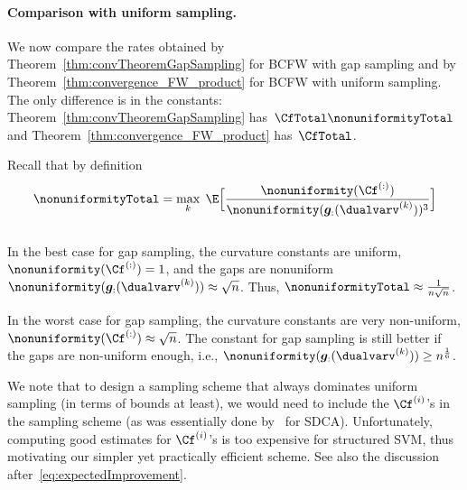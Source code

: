 \documentclass{article}
\begin{document}
\paragraph{Comparison with uniform sampling.} 
We now compare the rates obtained by Theorem~\ref{thm:convTheoremGapSampling} for BCFW with gap sampling and by Theorem~\ref{thm:convergence_FW_product} for BCFW with uniform sampling. The only difference is in the constants: Theorem~\ref{thm:convTheoremGapSampling} has~$\CfTotal \nonuniformityTotal$ and Theorem~\ref{thm:convergence_FW_product} has~$\CfTotal$. 

Recall that by definition\\[-0.4cm]
\begin{equation*}
\nonuniformityTotal = \max_k \;\E \Big[ \frac{\nonuniformity(\Cf^{(:)})}{\nonuniformity(\bm{g}_{:}(\dualvarv^{(k)}))^3} \Big]
\end{equation*}\\[-0.3cm]
In the best case for gap sampling, the curvature constants are uniform, $\nonuniformity(\Cf^{(:)})=1$, and the gaps are nonuniform~$\nonuniformity(\bm{g}_{:}(\dualvarv^{(k)})) \approx \sqrt{n}$. Thus, $\nonuniformityTotal \approx \frac{1}{n\sqrt{n}}$.

In the worst case for gap sampling, the curvature constants are very non-uniform, $\nonuniformity(\Cf^{(:)}) \approx \sqrt{n}$. The constant for gap sampling is still better if the gaps are non-uniform enough, i.e., $\nonuniformity(\bm{g}_{:}(\dualvarv^{(k)})) \geq n^{\frac{1}{6}}$. 

We note that to design a sampling scheme that always dominates uniform sampling (in terms of bounds at least), we would need to include the $\Cf^{(i)}$'s in the sampling scheme (as was essentially done by~\citet{Csiba15adaSDCA} for SDCA). Unfortunately, computing good estimates for $\Cf^{(i)}$'s is too expensive for structured SVM, thus motivating our simpler yet practically efficient scheme. See also the discussion after~\eqref{eq:expectedImprovement}.
\end{document}
